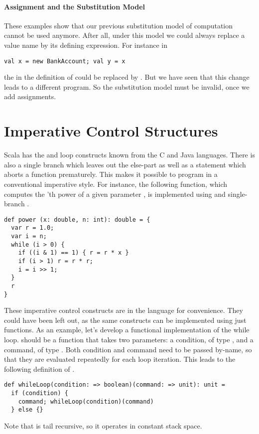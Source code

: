{\paragraph{Assignment and the Substitution Model}
These examples show that our previous substitution model of
computation cannot be used anymore.  After all, under this
model we could always replace a value name by its
defining expression.
For instance in
\begin{lstlisting}
val x = new BankAccount; val y = x
\end{lstlisting}
the  in the definition of  could
be replaced by .
But we have seen that this change leads to a different program.
So the substitution model must be invalid, once we add assignments. 

\section{Imperative Control Structures}

Scala has the  and  loop constructs known
from the C and Java languages. There is also a single branch 
which leaves out the else-part as well as a  statement which
aborts a function prematurely. This makes it possible to program in a
conventional imperative style. For instance, the following function,
which computes the 'th power of a given parameter , is
implemented using  and single-branch .
\begin{lstlisting}
def power (x: double, n: int): double = {
  var r = 1.0;
  var i = n;
  while (i > 0) { 
    if ((i & 1) == 1) { r = r * x }
    if (i > 1) r = r * r;
    i = i >> 1;
  }
  r
}
\end{lstlisting}
These imperative control constructs are in the language for
convenience. They could have been left out, as the same constructs can
be implemented using just functions. As an example, let's develop a
functional implementation of the while loop.  should
be a function that takes two parameters: a condition, of type
, and a command, of type . Both condition and
command need to be passed by-name, so that they are evaluated
repeatedly for each loop iteration.  This leads to the following
definition of .
\begin{lstlisting}
def whileLoop(condition: => boolean)(command: => unit): unit = 
  if (condition) {
    command; whileLoop(condition)(command)
  } else {}
\end{lstlisting}
Note that  is tail recursive, so it operates in
constant stack space.

}
